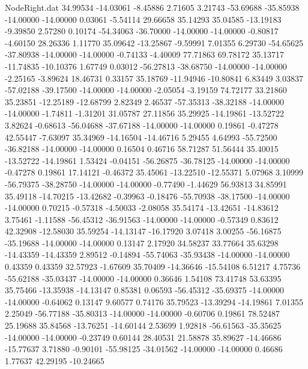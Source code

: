 \begin{filecontents}{NodeRight.dat}
  34.99534  -14.03061   -8.45886     2.71605    3.21743  -53.69688  -35.85938  -14.00000  -14.00000    0.03061   -5.54114   29.66658   35.14293
  35.04585  -13.19183   -9.39850     2.57280    0.10174  -54.34063  -36.70000  -14.00000  -14.00000   -0.80817   -4.60150   28.26336    1.11770
  35.09642  -13.25867   -9.59991     7.01355    6.29730  -54.65625  -37.80938  -14.00000  -14.00000   -0.74133   -4.40009   77.71863   69.78172
  35.13717  -11.74835  -10.10376     1.67749    0.03012  -56.27813  -38.68750  -14.00000  -14.00000   -2.25165   -3.89624   18.46731    0.33157
  35.18769  -11.94946  -10.80841     6.83449    3.03837  -57.02188  -39.17500  -14.00000  -14.00000   -2.05054   -3.19159   74.72177   33.21860
  35.23851  -12.25189  -12.68799     2.82349    2.46537  -57.35313  -38.32188  -14.00000  -14.00000   -1.74811   -1.31201   31.05787   27.11856
  35.29925  -14.19861  -13.52722     3.82624   -0.68613  -56.04688  -37.67188  -14.00000  -14.00000    0.19861   -0.47278   42.55447   -7.63097
  35.34969  -14.16504  -14.46716     5.29455    4.64993  -55.72500  -36.82188  -14.00000  -14.00000    0.16504    0.46716   58.71287   51.56444
  35.40015  -13.52722  -14.19861     1.53424   -0.04151  -56.26875  -36.78125  -14.00000  -14.00000   -0.47278    0.19861   17.14121   -0.46372
  35.45061  -13.22510  -12.55371     5.07968    3.10999  -56.79375  -38.28750  -14.00000  -14.00000   -0.77490   -1.44629   56.93813   34.85991
  35.49118  -14.70215  -13.42682    -0.39963   -0.18476  -55.70938  -38.17500  -14.00000  -14.00000    0.70215   -0.57318   -4.50033   -2.08058
  35.54174  -13.42651  -14.83612     3.75461   -1.11588  -56.45312  -36.91563  -14.00000  -14.00000   -0.57349    0.83612   42.32908  -12.58030
  35.59254  -14.13147  -16.17920     3.07418    3.00255  -56.16875  -35.19688  -14.00000  -14.00000    0.13147    2.17920   34.58237   33.77664
  35.63298  -14.43359  -14.43359     2.89512   -0.14894  -55.74063  -35.93438  -14.00000  -14.00000    0.43359    0.43359   32.57923   -1.67609
  35.70409  -14.36646  -15.54108     6.51217    4.75736  -55.62188  -35.03437  -14.00000  -14.00000    0.36646    1.54108   73.41748   53.63395
  35.75466  -13.35938  -14.13147     0.85381    0.06593  -56.45312  -35.69375  -14.00000  -14.00000   -0.64062    0.13147    9.60577    0.74176
  35.79523  -13.39294  -14.19861     7.01355    2.25049  -56.77188  -35.80313  -14.00000  -14.00000   -0.60706    0.19861   78.52487   25.19688
  35.84568  -13.76251  -14.60144     2.53699    1.92818  -56.61563  -35.35625  -14.00000  -14.00000   -0.23749    0.60144   28.40531   21.58878
  35.89627  -14.46686  -15.77637     3.71880   -0.90101  -55.98125  -34.01562  -14.00000  -14.00000    0.46686    1.77637   42.29195  -10.24665

\end{filecontents}
